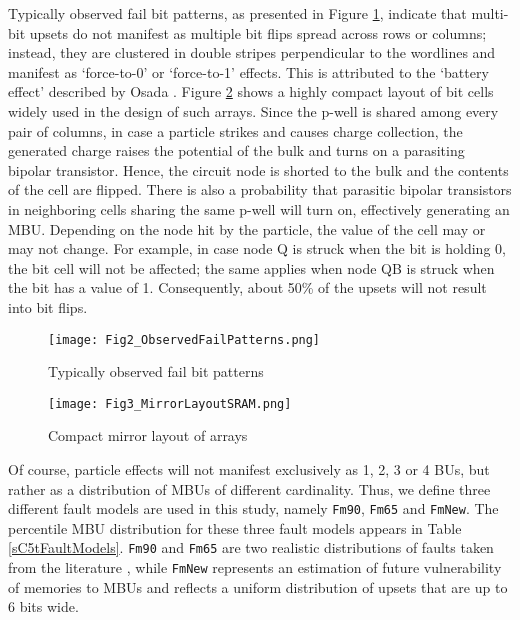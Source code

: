\documentclass[12pt]{yalephd}
\begin{document}
Typically observed fail bit patterns, as presented in Figure \ref{sC5fFailPatterns}, indicate that multi-bit upsets do not manifest as multiple bit flips spread across rows or columns; instead, they are clustered in double stripes perpendicular to the wordlines and manifest as `force-to-0' or `force-to-1' effects. This is attributed to the `battery effect' described by Osada \cite{osada2004sram}. Figure \ref{sC5fMirrorLayout} shows a highly compact layout of bit cells widely used in the design of such arrays. Since the p-well is shared among every pair of columns, in case a particle strikes and causes charge collection, the generated charge raises the potential of the bulk and turns on a parasiting bipolar transistor. Hence, the circuit node is shorted to the bulk and the contents of the cell are flipped. There is also a probability that parasitic bipolar transistors in neighboring cells sharing the same p-well will turn on, effectively generating an MBU. Depending on the node hit by the particle, the value of the cell may or may not change. For example, in case node Q is struck when the bit is holding 0, the bit cell will not be affected; the same applies when node QB is struck when the bit has a value of 1. Consequently, about 50\% of the upsets will not result into bit flips.

\begin{figure}[!ht]%
\centering
\texttt{[image: Fig2\_ObservedFailPatterns.png]}%
\caption{Typically observed fail bit patterns \cite{georgakos2007investigation}}%
\label{sC5fFailPatterns}%
\end{figure}

\begin{figure}[!ht]%
\centering
\texttt{[image: Fig3\_MirrorLayoutSRAM.png]}%
\caption{Compact mirror layout of arrays \cite{george2010transient}}%
\label{sC5fMirrorLayout}%
\end{figure}

Of course, particle effects will not manifest exclusively as 1, 2, 3 or 4 BUs, but rather as a distribution of MBUs of different cardinality. Thus, we define three different fault models are used in this study, namely {\tt Fm90}, {\tt Fm65} and {\tt FmNew}. The percentile MBU distribution for these three fault models appears in Table \ref{sC5tFaultModels}. {\tt Fm90} and {\tt Fm65} are two realistic distributions of faults taken from the literature \cite{georgakos2007investigation}, while {\tt FmNew} represents an estimation of future vulnerability of memories to MBUs and reflects a uniform distribution of upsets that are up to 6 bits wide.
\end{document}

